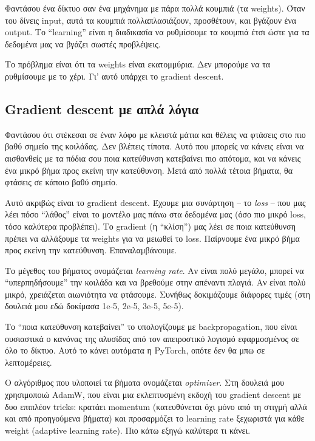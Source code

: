 \documentclass[12pt]{fphw}
\begin{document}
Φαντάσου ένα δίκτυο σαν ένα μηχάνημα με πάρα πολλά κουμπιά (τα weights). Όταν του δίνεις input, αυτά τα κουμπιά πολλαπλασιάζουν, προσθέτουν, και βγάζουν ένα output. Το ``learning'' είναι η διαδικασία να ρυθμίσουμε τα κουμπιά έτσι ώστε για τα δεδομένα μας να βγάζει σωστές προβλέψεις.

Το πρόβλημα είναι ότι τα weights είναι εκατομμύρια. Δεν μπορούμε να τα ρυθμίσουμε με το χέρι. Γι' αυτό υπάρχει το gradient descent.

\subsection{Gradient descent με απλά λόγια}

Φαντάσου ότι στέκεσαι σε έναν λόφο με κλειστά μάτια και θέλεις να φτάσεις στο πιο βαθύ σημείο της κοιλάδας. Δεν βλέπεις τίποτα. Αυτό που μπορείς να κάνεις είναι να αισθανθείς με τα πόδια σου ποια κατεύθυνση κατεβαίνει πιο απότομα, και να κάνεις ένα μικρό βήμα προς εκείνη την κατεύθυνση. Μετά από πολλά τέτοια βήματα, θα φτάσεις σε κάποιο βαθύ σημείο.

Αυτό ακριβώς είναι το gradient descent. Έχουμε μια συνάρτηση -- το \emph{loss} -- που μας λέει πόσο ``λάθος'' είναι το μοντέλο μας πάνω στα δεδομένα μας (όσο πιο μικρό loss, τόσο καλύτερα προβλέπει). Το gradient (η ``κλίση'') μας λέει σε ποια κατεύθυνση πρέπει να αλλάξουμε τα weights για να μειωθεί το loss. Παίρνουμε ένα μικρό βήμα προς εκείνη την κατεύθυνση. Επαναλαμβάνουμε.

Το μέγεθος του βήματος ονομάζεται \emph{learning rate}. Αν είναι πολύ μεγάλο, μπορεί να ``υπερπηδήσουμε'' την κοιλάδα και να βρεθούμε στην απέναντι πλαγιά. Αν είναι πολύ μικρό, χρειάζεται αιωνιότητα να φτάσουμε. Συνήθως δοκιμάζουμε διάφορες τιμές (στη δουλειά μου εδώ δοκίμασα 1e-5, 2e-5, 3e-5, 5e-5).

Το ``ποια κατεύθυνση κατεβαίνει'' το υπολογίζουμε με backpropagation, που είναι ουσιαστικά ο κανόνας της αλυσίδας από τον απειροστικό λογισμό εφαρμοσμένος σε όλο το δίκτυο. Αυτό το κάνει αυτόματα η PyTorch, οπότε δεν θα μπω σε λεπτομέρειες.

Ο αλγόριθμος που υλοποιεί τα βήματα ονομάζεται \emph{optimizer}. Στη δουλειά μου χρησιμοποιώ AdamW, που είναι μια εκλεπτυσμένη εκδοχή του gradient descent με δυο επιπλέον tricks: κρατάει momentum (κατευθύνεται όχι μόνο από τη στιγμή αλλά και από προηγούμενα βήματα) και προσαρμόζει το learning rate ξεχωριστά για κάθε weight (adaptive learning rate). Πιο κάτω εξηγώ καλύτερα τι κάνει.
\end{document}
